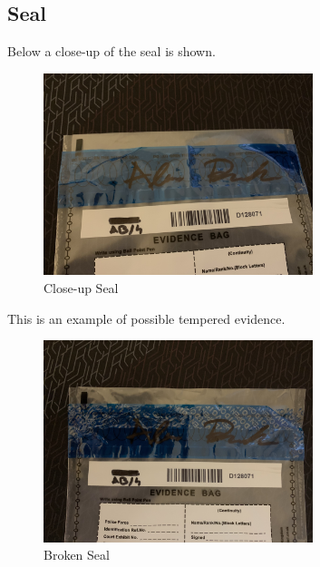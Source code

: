 \subsection{Seal}

Below a close-up of the seal is shown.
\label{s:closeup}
\begin{figure}[h]
  \centering
  \includegraphics[width=0.7\textwidth]{figures/pictures/IMG_5055.JPG}
  \caption{Close-up Seal}
  \label{fig:closeup}
\end{figure}

This is an example of possible tempered evidence.
\label{s:broken-seal}
\begin{figure}[h]
  \centering
  \includegraphics[width=0.7\textwidth, angle=180,origin=c]{figures/pictures/IMG_5059.JPG}
  \caption{Broken Seal}
  \label{fig:broken}
\end{figure}
\newpage
